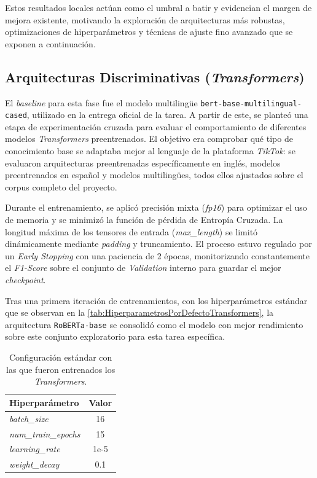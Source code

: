 Estos resultados locales actúan como el umbral a batir y evidencian el margen de mejora existente, motivando la exploración de arquitecturas más robustas, optimizaciones de hiperparámetros y técnicas de ajuste fino avanzado que se exponen a continuación.

\subsection{Arquitecturas Discriminativas (\textit{Transformers})}
\label{subsec:ArquitecturasDiscriminativasTransformers}
El \textit{baseline} para esta fase fue el modelo multilingüe \texttt{bert-base-multilingual-cased}, utilizado en la entrega oficial de la tarea. A partir de este, se planteó una etapa de experimentación cruzada para evaluar el comportamiento de diferentes modelos \textit{Transformers} preentrenados. El objetivo era comprobar qué tipo de conocimiento base se adaptaba mejor al lenguaje de la plataforma \textit{TikTok}: se evaluaron arquitecturas preentrenadas específicamente en inglés, modelos preentrenados en español y modelos multilingües, todos ellos ajustados sobre el corpus completo del proyecto. 

Durante el entrenamiento, se aplicó precisión mixta (\textit{fp16}) para optimizar el uso de memoria y se minimizó la función de pérdida de Entropía Cruzada. La longitud máxima de los tensores de entrada (\textit{max\_length}) se limitó dinámicamente mediante \textit{padding} y truncamiento. El proceso estuvo regulado por un \textit{Early Stopping} con una paciencia de 2 épocas, monitorizando constantemente el \textit{F1-Score} sobre el conjunto de \textit{Validation} interno para guardar el mejor \textit{checkpoint}.

Tras una primera iteración de entrenamientos, con los hiperparámetros estándar que se observan en la \autoref{tab:HiperparametrosPorDefectoTransformers}, la arquitectura \texttt{RoBERTa-base} se consolidó como el modelo con mejor rendimiento sobre este conjunto exploratorio para esta tarea específica. 

\begin{table}[H]
    \centering
    \begin{tabular}{lc}
        \toprule
        \textbf{Hiperparámetro} & \textbf{Valor} \\
        \midrule
        \textit{batch\_size} & 16 \\
        \textit{num\_train\_epochs} & 15 \\
        \textit{learning\_rate} & 1e-5 \\
        \textit{weight\_decay} & 0.1 \\
        \bottomrule
    \end{tabular}
    \caption{Configuración estándar con las que fueron entrenados los \textit{Transformers}.}
    \label{tab:HiperparametrosPorDefectoTransformers}
\end{table}

